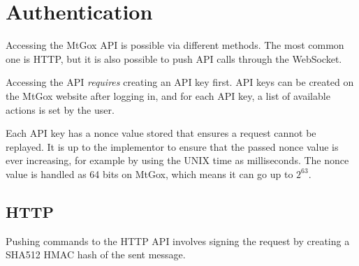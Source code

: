 \section{Authentication}

Accessing the MtGox API is possible via different methods. The most common one
is HTTP, but it is also possible to push API calls through the WebSocket.

Accessing the API \emph{requires} creating an API key first. API keys can be
created on the MtGox website after logging in, and for each API key, a list
of available actions is set by the user.

Each API key has a nonce value stored that ensures a request cannot be
replayed. It is up to the implementor to ensure that the passed nonce value is
ever increasing, for example by using the UNIX time as milliseconds. The nonce
value is handled as 64 bits on MtGox, which means it can go up to $2^{63}$.

\subsection{HTTP}

Pushing commands to the HTTP API involves signing the request by creating a
SHA512 HMAC hash of the sent message.

